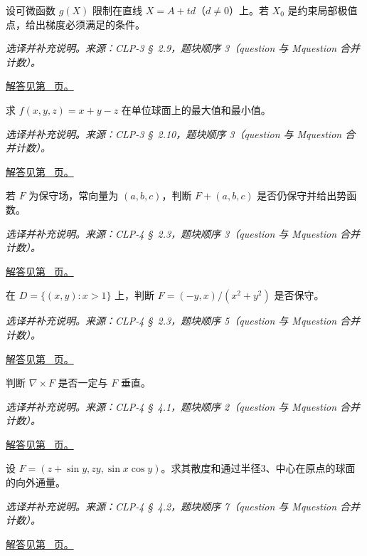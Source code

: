 \documentclass[12pt,fontset=fandol]{ctexart}
\begin{document}
\begin{example}[直线约束下的极值必要条件]\label{ex:c45q18}
设可微函数 $g(X)$ 限制在直线 $X=A+td$（$d\ne0$）上。若 $X_0$ 是约束局部极值点，给出梯度必须满足的条件。
\par\textit{选译并补充说明。来源：CLP-3 \S~2.9，题块顺序 3（question 与 Mquestion 合并计数）。}\par\hyperref[ans:c45q18]{解答见第~\pageref{ans:c45q18} 页。}
\end{example}
\begin{example}[球面上的线性函数]\label{ex:c45q19}
求 $f(x,y,z)=x+y-z$ 在单位球面上的最大值和最小值。
\par\textit{选译并补充说明。来源：CLP-3 \S~2.10，题块顺序 3（question 与 Mquestion 合并计数）。}\par\hyperref[ans:c45q19]{解答见第~\pageref{ans:c45q19} 页。}
\end{example}
\begin{example}[保守场加常向量]\label{ex:c45q20}
若 $F$ 为保守场，常向量为 $(a,b,c)$，判断 $F+(a,b,c)$ 是否仍保守并给出势函数。
\par\textit{选译并补充说明。来源：CLP-4 \S~2.3，题块顺序 3（question 与 Mquestion 合并计数）。}\par\hyperref[ans:c45q20]{解答见第~\pageref{ans:c45q20} 页。}
\end{example}
\begin{example}[限制定义域后恢复势函数]\label{ex:c45q21}
在 $D=\{(x,y):x>1\}$ 上，判断 $F=(-y,x)/(x^2+y^2)$ 是否保守。
\par\textit{选译并补充说明。来源：CLP-4 \S~2.3，题块顺序 5（question 与 Mquestion 合并计数）。}\par\hyperref[ans:c45q21]{解答见第~\pageref{ans:c45q21} 页。}
\end{example}
\begin{example}[旋度未必垂直原场]\label{ex:c45q22}
判断 $\nabla\times F$ 是否一定与 $F$ 垂直。
\par\textit{选译并补充说明。来源：CLP-4 \S~4.1，题块顺序 2（question 与 Mquestion 合并计数）。}\par\hyperref[ans:c45q22]{解答见第~\pageref{ans:c45q22} 页。}
\end{example}
\begin{example}[由对称性得到零通量]\label{ex:c45q23}
设 $F=(z+\sin y,zy,\sin x\cos y)$。求其散度和通过半径3、中心在原点的球面的向外通量。
\par\textit{选译并补充说明。来源：CLP-4 \S~4.2，题块顺序 7（question 与 Mquestion 合并计数）。}\par\hyperref[ans:c45q23]{解答见第~\pageref{ans:c45q23} 页。}
\end{example}
\end{document}
